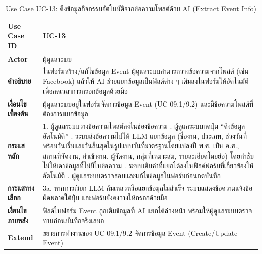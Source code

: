 \begin{table}[H]
\centering
\caption{Use Case UC-13: ดึงข้อมูลกิจกรรมอัตโนมัติจากข้อความโพสต์ด้วย AI (Extract Event Info)}
\label{tab:uc13}
\begin{tabular}{|p{3.2cm}|p{10cm}|}
\hline
\textbf{Use Case ID} & UC-13 \\ \hline
\textbf{Actor} & ผู้ดูแลระบบ \\ \hline
\textbf{คำอธิบาย} & ในฟอร์มสร้าง/แก้ไขข้อมูล Event ผู้ดูแลระบบสามารถวางข้อความจากโพสต์ (เช่น Facebook) แล้วให้ AI ช่วยแยกข้อมูลเป็นฟิลด์ต่าง ๆ เติมลงในฟอร์มให้อัตโนมัติ เพื่อลดเวลาการกรอกข้อมูลด้วยมือ \\ \hline
\textbf{เงื่อนไขเบื้องต้น} & ผู้ดูแลระบบอยู่ในฟอร์มจัดการข้อมูล Event (UC-09.1/9.2) และมีข้อความโพสต์ที่ต้องการแยกข้อมูล \\ \hline
\textbf{กระแสหลัก} & 1. ผู้ดูแลระบบวางข้อความโพสต์ลงในช่องข้อความ \newline 2. ผู้ดูแลระบบกดปุ่ม ``ดึงข้อมูลอัตโนมัติ'' \newline 3. ระบบส่งข้อความไปให้ LLM แยกข้อมูล (ชื่องาน, ประเภท, ช่วงวันที่ พร้อมวันเริ่มและวันสิ้นสุดในรูปแบบวันที่มาตรฐานโดยแปลงปี พ.ศ. เป็น ค.ศ., สถานที่จัดงาน, ค่าเข้างาน, ผู้จัดงาน, กลุ่มที่เหมาะสม, รายละเอียดโดยย่อ) โดยกำชับไม่ให้เดาข้อมูลที่ไม่มีในข้อความ \newline 4. ระบบเติมค่าที่แยกได้ลงในฟิลด์ฟอร์มที่เกี่ยวข้องให้อัตโนมัติ \newline 5. ผู้ดูแลระบบตรวจสอบและแก้ไขข้อมูลในฟอร์มก่อนกดบันทึก \\ \hline
\textbf{กระแสทางเลือก} & 3a. หากการเรียก LLM ล้มเหลวหรือแยกข้อมูลไม่สำเร็จ ระบบแสดงข้อความแจ้งข้อผิดพลาดใต้ปุ่ม และฟอร์มยังคงว่างให้กรอกด้วยมือ \\ \hline
\textbf{เงื่อนไขภายหลัง} & ฟิลด์ในฟอร์ม Event ถูกเติมข้อมูลที่ AI แยกได้ล่วงหน้า พร้อมให้ผู้ดูแลระบบตรวจทานก่อนบันทึกจริงเสมอ \\ \hline
\textbf{Extend} & ขยายการทำงานของ UC-09.1/9.2 จัดการข้อมูล Event (Create/Update Event) \\
\hline
\end{tabular}
\end{table}

